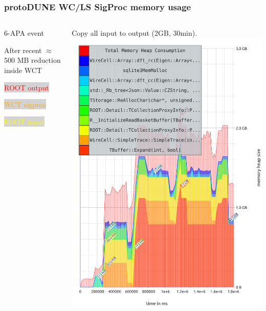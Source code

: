 \documentclass[xcolor=dvipsnames]{beamer}
\begin{document}
\begin{frame}
  \frametitle{protoDUNE WC/LS SigProc memory usage}
  \begin{columns}
    \begin{column}{0.2\textwidth}
      \tiny

      6-APA event

      \vspace{2mm}

      After recent $\approx$ 500 MB reduction inside WCT

      \vspace{2mm}

      \colorbox{lightgray}{\textcolor{red}{ROOT output}}

      \colorbox{lightgray}{\textcolor{orange}{WCT sigproc}}

      \colorbox{lightgray}{\textcolor{yellow}{ROOT input}}

    \end{column}

    \begin{column}{0.4\textwidth}
      \begin{center}
        \tiny Copy all input to output (2GB, 30min).
        \includegraphics[height=0.8\textheight]{shunt.pdf}    
        

\end{center}
\end{column}
\end{columns}
\end{frame}
\end{document}
